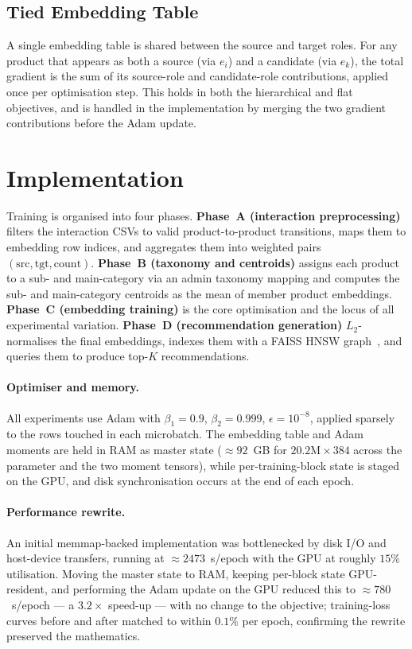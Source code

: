 \subsection{Tied Embedding Table}
A single embedding table is shared between the source and target roles. For any
product that appears as both a source (via $e_i$) and a candidate (via $e_k$),
the total gradient is the sum of its source-role and candidate-role
contributions, applied once per optimisation step. This holds in both the
hierarchical and flat objectives, and is handled in the implementation by
merging the two gradient contributions before the Adam update.

\section{Implementation}
\label{sec:emb-impl}

Training is organised into four phases. \textbf{Phase~A (interaction
preprocessing)} filters the interaction CSVs to valid product-to-product
transitions, maps them to embedding row indices, and aggregates them into
weighted pairs $(\text{src},\text{tgt},\text{count})$. \textbf{Phase~B
(taxonomy and centroids)} assigns each product to a sub- and main-category via
an admin taxonomy mapping and computes the sub- and main-category centroids as
the mean of member product embeddings. \textbf{Phase~C (embedding training)} is
the core optimisation and the locus of all experimental variation.
\textbf{Phase~D (recommendation generation)} $L_2$-normalises the final
embeddings, indexes them with a FAISS HNSW graph~\cite{FAISS,HNSW}, and queries
them to produce top-$K$ recommendations.

\paragraph{Optimiser and memory.}
All experiments use Adam with $\beta_1=0.9$, $\beta_2=0.999$,
$\epsilon=10^{-8}$, applied sparsely to the rows touched in each microbatch. The
embedding table and Adam moments are held in RAM as master state
($\approx 92$~GB for $20.2\text{M}\times 384$ across the parameter and the two
moment tensors), while per-training-block state is staged on the GPU, and disk
synchronisation occurs at the end of each epoch.

\paragraph{Performance rewrite.}
An initial memmap-backed implementation was bottlenecked by disk I/O and
host-device transfers, running at $\approx 2473$~s/epoch with the GPU at roughly
$15\%$ utilisation. Moving the master state to RAM, keeping per-block state
GPU-resident, and performing the Adam update on the GPU reduced this to
$\approx 780$~s/epoch --- a $3.2\times$ speed-up --- with no change to the
objective; training-loss curves before and after matched to within $0.1\%$ per
epoch, confirming the rewrite preserved the mathematics.

